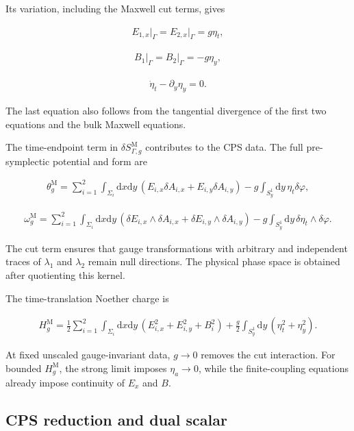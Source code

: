 Its variation, including the Maxwell cut terms, gives

\begin{align}
E_{1,x}\big|_\Gamma
=E_{2,x}\big|_\Gamma
=g\eta_t,
\end{align}

\begin{align}
B_1\big|_\Gamma
=B_2\big|_\Gamma
=-g\eta_y,
\end{align}

\begin{align}
\dot\eta_t-\partial_y\eta_y=0.
\end{align}

The last equation also follows from the tangential divergence of the first two equations and the bulk Maxwell equations.

The time-endpoint term in $\delta S_{\Gamma,g}^{\mathrm M}$ contributes to the CPS data. The full pre-symplectic potential and form are

\begin{align}
\theta_g^{\mathrm M}
=\sum_{i=1}^2\int_{\Sigma_i}\mathrm dx\mathrm dy\,
(E_{i,x}\delta A_{i,x}+E_{i,y}\delta A_{i,y})
-g\int_{S_y^1}\mathrm dy\,\eta_t\delta\varphi,
\end{align}

\begin{align}
\omega_g^{\mathrm M}
=\sum_{i=1}^2\int_{\Sigma_i}\mathrm dx\mathrm dy\,
(\delta E_{i,x}\wedge\delta A_{i,x}
+\delta E_{i,y}\wedge\delta A_{i,y})
-g\int_{S_y^1}\mathrm dy\,
\delta\eta_t\wedge\delta\varphi.
\end{align}

The cut term ensures that gauge transformations with arbitrary and independent traces of $\lambda_1$ and $\lambda_2$ remain null directions. The physical phase space is obtained after quotienting this kernel.

The time-translation Noether charge is

\begin{align}
H_g^{\mathrm M}
=\frac12\sum_{i=1}^2\int_{\Sigma_i}\mathrm dx\mathrm dy\,
(E_{i,x}^2+E_{i,y}^2+B_i^2)
+\frac g2\int_{S_y^1}\mathrm dy\,
(\eta_t^2+\eta_y^2).
\end{align}

At fixed unscaled gauge-invariant data, $g\to0$ removes the cut interaction. For bounded $H_g^{\mathrm M}$, the strong limit imposes $\eta_a\to0$, while the finite-coupling equations already impose continuity of $E_x$ and $B$.

\subsection{CPS reduction and dual scalar}\label{subsec:maxwell-dual-scalar}

